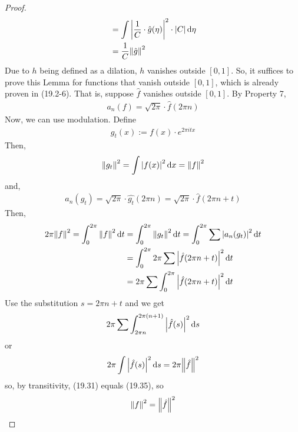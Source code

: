 \begin{enumerate}
\begin{proof}
\begin{align}
            &= \int \abs{\frac{1}{C} \cdot \hat{g}(\eta)}^2 \cdot \abs{C} \dd{\eta}\\
            &= \frac{1}{C} \norm{\hat{g}}^2
        \end{align}
        Due to $h$ being defined as a dilation, $h$ vanishes outside $[0,1]$. So, it suffices to prove this Lemma for functions that vanish outside $[0,1]$, which is already proven in (19.2-6). That is, suppose $\hat{f}$ vanishes outside $[0,1]$. By Property 7,
        \begin{align}
            a_n(f) = \sqrt{2\pi} \cdot \hat{f}(2\pi n)
        \end{align}
        Now, we can use modulation. Define
        \begin{align}
            g_t(x) := f(x) \cdot e^{2\pi it x}
        \end{align}
        Then,
        \begin{align}
            \norm{g_t}^2 = \int \abs{f(x)}^2 \dd{x} = \norm{f}^2
        \end{align}
        and,
        \begin{align}
            a_n(g_t) = \sqrt{2\pi} \cdot \hat{g_t}(2\pi n) = \sqrt{2\pi} \cdot \hat{f}(2\pi n + t)
        \end{align}
        Then,
        \begin{align}
            2\pi \norm{f}^2 = \int_0^{2\pi} \norm{f}^2 \dd{t} &= \int_0^{2\pi} \norm{g_t}^2 \dd{t} = \int_0^{2\pi} \sum \abs{a_n(g_t)}^2 \dd{t}\\
            &= \int_0^{2\pi} 2\pi \sum \abs{\hat{f}(2\pi n + t)}^2 \dd{t}\\
            &= 2\pi \sum \int_0^{2\pi} \abs{\hat{f}(2\pi n + t)}^2 \dd{t}
        \end{align}
        Use the substitution $s = 2\pi n + t$ and we get
        \begin{align}
            2\pi \sum \int_{2\pi n}^{2\pi (n + 1)} \abs{\hat{f}(s)}^2 \dd{s}
        \end{align}
        or
        \begin{align}
            2\pi \int \abs{\hat{f}(s)}^2 \dd{s} = 2\pi \norm{\hat{f}}^2
        \end{align}
        so, by transitivity, (19.31) equals (19.35), so
        \begin{align}
            \norm{f}^2 = \norm{\hat{f}}^2
        \end{align}
    \end{proof}
\end{enumerate}